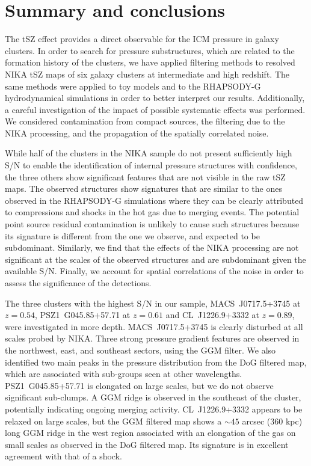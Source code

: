 \documentclass[traditabstract]{aa}
\begin{document}
\section{Summary and conclusions}\label{sec:Summary_and_conclusions}
The tSZ effect provides a direct observable for the ICM pressure in galaxy clusters. In order to search for pressure substructures, which are related to the formation history of the clusters, we have applied filtering methods to resolved NIKA tSZ maps of six galaxy clusters at intermediate and high redshift. The same methods were applied to toy models and to the RHAPSODY-G hydrodynamical simulations in order to better interpret our results. Additionally, a careful investigation of the impact of possible systematic effects was performed. We considered contamination from compact sources, the filtering due to the NIKA processing, and the propagation of the spatially correlated noise.

While half of the clusters in the NIKA sample do not present sufficiently high S/N to enable the identification of internal pressure structures with confidence, the three others show significant features that are not visible in the raw tSZ maps. The observed structures show signatures that are similar to the ones observed in the RHAPSODY-G simulations where they can be clearly attributed to compressions and shocks in the hot gas due to merging events. The potential point source residual contamination is unlikely to cause such structures because its signature is different from the one we observe, and expected to be subdominant. Similarly, we find that the effects of the NIKA processing are not significant at the scales of the observed structures and are subdominant given the available S/N. Finally, we account for spatial correlations of the noise in order to assess the significance of the detections.

The three  clusters with the highest S/N in our sample, \mbox{MACS~J0717.5+3745} at $z=0.54$, \mbox{PSZ1~G045.85+57.71} at $z=0.61$ and \mbox{CL~J1226.9+3332} at $z=0.89$, were investigated in more depth. \mbox{MACS~J0717.5+3745} is clearly disturbed at all scales probed by NIKA. Three strong pressure gradient features are observed in the northwest, east, and southeast sectors, using the GGM filter. We also identified two main peaks in the pressure distribution from the DoG filtered map, which are associated with sub-groups seen at other wavelengths. \mbox{PSZ1~G045.85+57.71} is elongated on large scales, but we do not observe significant sub-clumps. A GGM ridge is observed in the southeast of the cluster, potentially indicating ongoing merging activity. \mbox{CL~J1226.9+3332} appears to be relaxed on large scales, but the GGM filtered map shows a $\sim 45$ arcsec (360 kpc) long GGM ridge in the west region associated with an elongation of the gas on small scales as observed in the DoG filtered map. Its signature is in excellent agreement with that of a shock.
\end{document}
